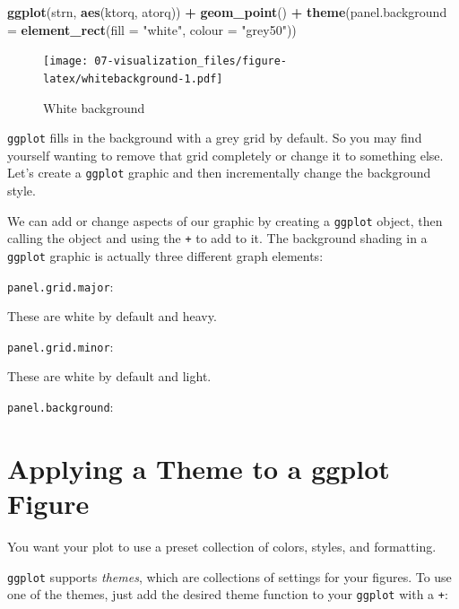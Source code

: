 \documentclass[
]{book}
\newenvironment{Shaded}{\begin{snugshade}}{\end{snugshade}}
\newcommand{\DataTypeTok}[1]{\textcolor[rgb]{0.13,0.29,0.53}{#1}}
\newcommand{\KeywordTok}[1]{\textcolor[rgb]{0.13,0.29,0.53}{\textbf{#1}}}
\newcommand{\NormalTok}[1]{#1}
\newcommand{\OperatorTok}[1]{\textcolor[rgb]{0.81,0.36,0.00}{\textbf{#1}}}
\newcommand{\StringTok}[1]{\textcolor[rgb]{0.31,0.60,0.02}{#1}}
\begin{document}
\begin{Shaded}
\begin{Highlighting}[]
\KeywordTok{ggplot}\NormalTok{(strn, }\KeywordTok{aes}\NormalTok{(ktorq, atorq)) }\OperatorTok{+}
\StringTok{  }\KeywordTok{geom_point}\NormalTok{() }\OperatorTok{+}
\StringTok{  }\KeywordTok{theme}\NormalTok{(}\DataTypeTok{panel.background =} \KeywordTok{element_rect}\NormalTok{(}\DataTypeTok{fill =} \StringTok{"white"}\NormalTok{, }\DataTypeTok{colour =} \StringTok{"grey50"}\NormalTok{))}
\end{Highlighting}
\end{Shaded}

\begin{figure}
\centering
\texttt{[image: 07-visualization\_files/figure-latex/whitebackground-1.pdf]}
\caption{\label{fig:whitebackground}White background}
\end{figure}

\texttt{ggplot} fills in the background with a grey grid by default. So you may find yourself wanting to remove that grid completely or change it to something else. Let's create a \texttt{ggplot} graphic and then incrementally change the background style.

We can add or change aspects of our graphic by creating a \texttt{ggplot} object, then calling the object and using the \texttt{+} to add to it. The background shading in a \texttt{ggplot} graphic is actually three different graph elements:

\texttt{panel.grid.major}:

These are white by default and heavy.

\texttt{panel.grid.minor}:

These are white by default and light.

\texttt{panel.background}:

\hypertarget{applying-a-theme-to-a-ggplot-figure}{%
\section{Applying a Theme to a ggplot Figure}\label{applying-a-theme-to-a-ggplot-figure}}

You want your plot to use a preset collection of colors, styles, and formatting.

\texttt{ggplot} supports \emph{themes}, which are collections of settings for your figures. To use one of the themes, just add the desired theme function to your \texttt{ggplot} with a \texttt{+}:
\end{document}
